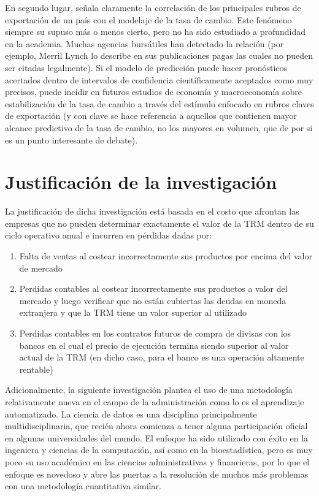 En segundo lugar, señala claramente la correlación de los principales rubros de exportación de un país con el modelaje de la tasa de cambio. Este fenómeno siempre su supuso más o menos cierto, pero no ha sido estudiado a profundidad en la academia. Muchas agencias bursátiles han detectado la relación (por ejemplo, Merril Lynch lo describe en sus publicaciones pagas las cuales no pueden ser citadas legalmente). Si el modelo de predicción puede hacer pronósticos acertados dentro de intervalos de confidencia científicamente aceptados como muy precisos, puede incidir en futuros estudios de economía y macroeconomía sobre estabilización de la tasa de cambio a través del estímulo enfocado en rubros claves de exportación (y con clave se hace referencia a aquellos que contienen mayor alcance predictivo de la tasa de cambio, no los mayores en volumen, que de por si es un punto interesante de debate).

\section{Justificación de la investigación}
La justificación de dicha investigación está basada en el costo que afrontan las empresas que no pueden determinar exactamente el valor de la TRM dentro de su ciclo operativo anual e incurren en pérdidas dadas por:

\begin{enumerate}
	\item Falta de ventas al costear incorrectamente sus productos por encima del valor de mercado
	\item Perdidas contables al costear incorrectamente sus productos a valor del mercado y luego verificar que no están cubiertas las deudas en moneda extranjera y que la TRM tiene un valor superior al utilizado
	\item Perdidas contables en los contratos futuros de compra de divisas con los bancos en el cual el precio de ejecución termina siendo superior al valor actual de la TRM (en dicho caso, para el banco es una operación altamente rentable)
\end{enumerate}

Adicionalmente, la siguiente investigación plantea el uso de una metodología relativamente nueva en el campo de la administración como lo es el aprendizaje automatizado. La ciencia de datos es una disciplina principalmente multidisciplinaria, que recién ahora comienza a tener alguna participación oficial en algunas universidades del mundo. El enfoque ha sido utilizado con éxito en la ingeniera y ciencias de la computación, así como en la bioestadística, pero es muy poco su uso académico en las ciencias administrativas y financieras, por lo que el enfoque es novedoso y abre las puertas a la resolución de muchos más problemas con una metodología cuantitativa similar.
